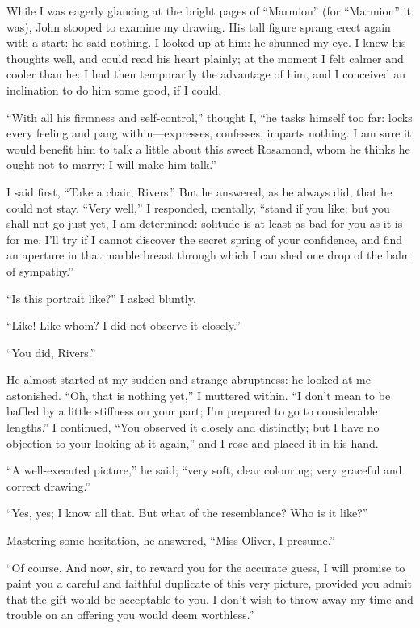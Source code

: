While I was eagerly glancing at the bright pages of \enquote{Marmion}
(for \enquote{Marmion} it was), \St{} John stooped to examine my drawing.
His tall figure sprang erect again with a start: he said nothing. I
looked up at him: he shunned my eye. I knew his thoughts well, and
could read his heart plainly; at the moment I felt calmer and cooler
than he: I had then temporarily the advantage of him, and I conceived an
inclination to do him some good, if I could.

\enquote{With all his firmness and self-control,} thought I, \enquote{he
	tasks himself too far: locks every feeling and pang within---expresses,
	confesses, imparts nothing. I am sure it would benefit him to talk a
	little about this sweet Rosamond, whom he thinks he ought not to marry:
	I will make him talk.}

I said first, \enquote{Take a chair, \Mr{} Rivers.} But he answered, as
he always did, that he could not stay. \enquote{Very well,} I
responded, mentally, \enquote{stand if you like; but you shall not go
	just yet, I am determined: solitude is at least as bad for you as it is
	for me. I'll try if I cannot discover the secret spring of your
	confidence, and find an aperture in that marble breast through which I
	can shed one drop of the balm of sympathy.}

\enquote{Is this portrait like?} I asked bluntly.

\enquote{Like! Like whom? I did not observe it closely.}

\enquote{You did, \Mr{} Rivers.}

He almost started at my sudden and strange abruptness: he looked at me
astonished. \enquote{Oh, that is nothing yet,} I muttered within.
\enquote{I don't mean to be baffled by a little stiffness on your part;
	I'm prepared to go to considerable lengths.} I continued, \enquote{You
	observed it closely and distinctly; but I have no objection to your
	looking at it again,} and I rose and placed it in his hand.

\enquote{A well-executed picture,} he said; \enquote{very soft, clear
	colouring; very graceful and correct drawing.}

\enquote{Yes, yes; I know all that. But what of the resemblance? Who
	is it like?}

Mastering some hesitation, he answered, \enquote{Miss Oliver, I
	presume.}

\enquote{Of course. And now, sir, to reward you for the accurate guess,
	I will promise to paint you a careful and faithful duplicate of this
	very picture, provided you admit that the gift would be acceptable to
	you. I don't wish to throw away my time and trouble on an offering you
	would deem worthless.}

